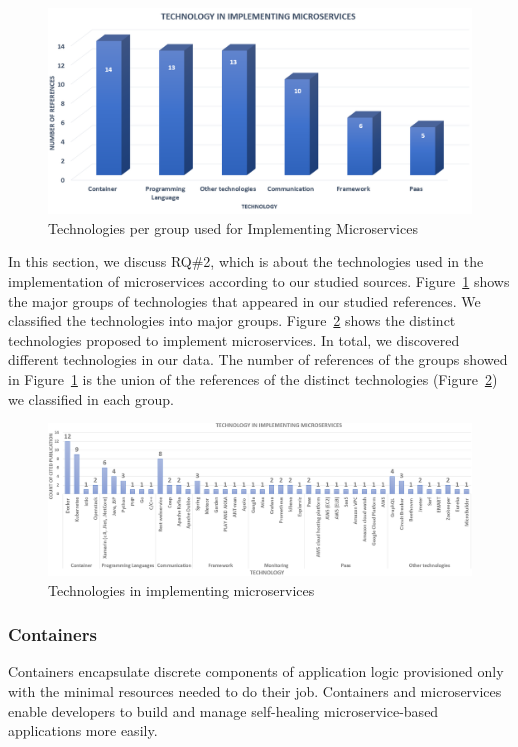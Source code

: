 \begin{figure}[h]
	\centering
	\includegraphics[width=0.5\linewidth]{images/commtechother.png}
	\caption{Technologies per group used for Implementing Microservices}
	\label{fig:tech-group}
\end{figure}	

In this section, we discuss RQ\#2, which is about the technologies used in the implementation of microservices according to our studied sources. Figure~\ref{fig:tech-group} shows the major groups of technologies that appeared in our studied references. We classified the technologies into \techgroupcount major groups.
Figure~\ref{fig:tech-distinct} shows the distinct technologies proposed to implement microservices. In total, we discovered \techcount different technologies in our data. 
The number of references of the groups showed in Figure~\ref{fig:tech-group} is the union of the references of the distinct technologies (Figure~\ref{fig:tech-distinct}) we classified in each group.  

\begin{figure}[t]
	\centering
	\includegraphics[width=\linewidth]{images/commontechupdated.png}
	\caption{Technologies in implementing microservices }
	\label{fig:tech-distinct}
\end{figure}


\subsubsection{Containers}
Containers encapsulate discrete components of application logic provisioned only with the minimal resources needed to do their job. Containers and microservices enable developers to build and manage self-healing microservice-based applications more easily.
 
